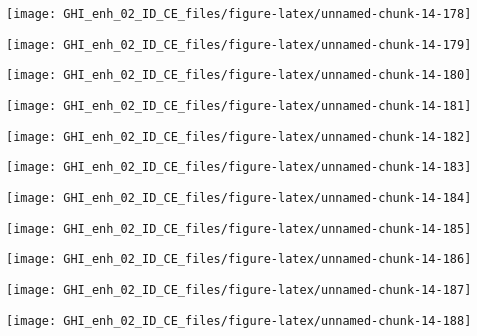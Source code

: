 \documentclass[
  10pt,
  a4paper,oneside]{article}
\begin{document}
\begin{center}\texttt{[image: GHI\_enh\_02\_ID\_CE\_files/figure-latex/unnamed-chunk-14-178]} \end{center}

\begin{center}\texttt{[image: GHI\_enh\_02\_ID\_CE\_files/figure-latex/unnamed-chunk-14-179]} \end{center}

\begin{center}\texttt{[image: GHI\_enh\_02\_ID\_CE\_files/figure-latex/unnamed-chunk-14-180]} \end{center}

\begin{center}\texttt{[image: GHI\_enh\_02\_ID\_CE\_files/figure-latex/unnamed-chunk-14-181]} \end{center}

\begin{center}\texttt{[image: GHI\_enh\_02\_ID\_CE\_files/figure-latex/unnamed-chunk-14-182]} \end{center}

\begin{center}\texttt{[image: GHI\_enh\_02\_ID\_CE\_files/figure-latex/unnamed-chunk-14-183]} \end{center}

\begin{center}\texttt{[image: GHI\_enh\_02\_ID\_CE\_files/figure-latex/unnamed-chunk-14-184]} \end{center}

\begin{center}\texttt{[image: GHI\_enh\_02\_ID\_CE\_files/figure-latex/unnamed-chunk-14-185]} \end{center}

\begin{center}\texttt{[image: GHI\_enh\_02\_ID\_CE\_files/figure-latex/unnamed-chunk-14-186]} \end{center}

\begin{center}\texttt{[image: GHI\_enh\_02\_ID\_CE\_files/figure-latex/unnamed-chunk-14-187]} \end{center}

\begin{center}\texttt{[image: GHI\_enh\_02\_ID\_CE\_files/figure-latex/unnamed-chunk-14-188]} \end{center}
\end{document}
